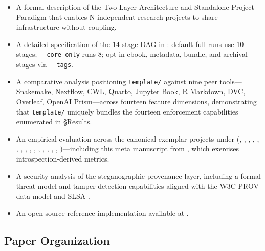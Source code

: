 \documentclass[
]{article}
\providecommand{\tightlist}{%
  \setlength{\itemsep}{0pt}\setlength{\parskip}{0pt}}
\begin{document}
\begin{itemize}
\tightlist
\item
  A formal description of the Two-Layer Architecture and Standalone
  Project Paradigm that enables N independent research projects to share
  infrastructure without coupling.
\item
  A detailed specification of the 14-stage DAG in
  : default full runs
  use 10 stages; \texttt{-\/-core-only} runs 8; opt-in ebook, metadata,
  bundle, and archival stages via \texttt{-\/-tags}.
\item
  A comparative analysis positioning \texttt{template/} against nine
  peer tools---Snakemake, Nextflow, CWL, Quarto, Jupyter Book, R
  Markdown, DVC, Overleaf, OpenAI Prism---across fourteen feature
  dimensions, demonstrating that \texttt{template/} uniquely bundles the
  fourteen enforcement capabilities enumerated in §Results.
\item
  An empirical evaluation across the canonical exemplar projects under
  (,
  ,
  ,
  ,
  ,
  ,
  ,
  ,
  ,
  ,
  ,
  ,
  ,
  ,
  ,
  )---including this meta
  manuscript from , which
  exercises introspection-derived metrics.
\item
  A security analysis of the steganographic provenance layer, including
  a formal threat model and tamper-detection capabilities aligned with
  the W3C PROV data model \citep{moreau2013provdm} and SLSA
  \citep{openssf2023slsa}.
\item
  An open-source reference implementation available at
  .
\end{itemize}

\subsection{Paper Organization}\label{paper-organization}
\end{document}
